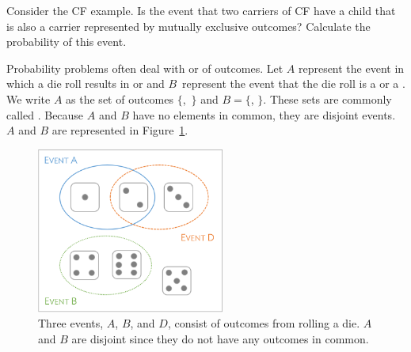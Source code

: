 \textD{\newpage}


\begin{exercisewrap}
\begin{nexercise}
Consider the CF example. Is the event that two carriers of CF have a child that is also a carrier represented by mutually exclusive outcomes? Calculate the probability of this event.\footnotemark{}
\end{nexercise}
\end{exercisewrap}

Probability problems often deal with  or  of outcomes. Let $A$ represent the event in which a die roll results in  or  and $B$~represent the event that the die roll is a  or a . We write $A$ as the set of outcomes $\{$,~$\}$ and $B=\{$, $\}$. These sets are commonly called . Because $A$ and $B$ have no elements in common, they are disjoint events. $A$ and $B$ are represented in Figure~\ref{fig:disjointEvents}.

\begin{figure}[hhh]
\centering
\includegraphics[width=0.55\textwidth]{ch_probability_oi_biostat/figures/disjointEvents/disjointEvents.png}
\caption{Three events, $A$, $B$, and $D$, consist of outcomes from rolling a die. $A$ and $B$ are disjoint since they do not have any outcomes in common.}
\label{fig:disjointEvents}
\end{figure}

